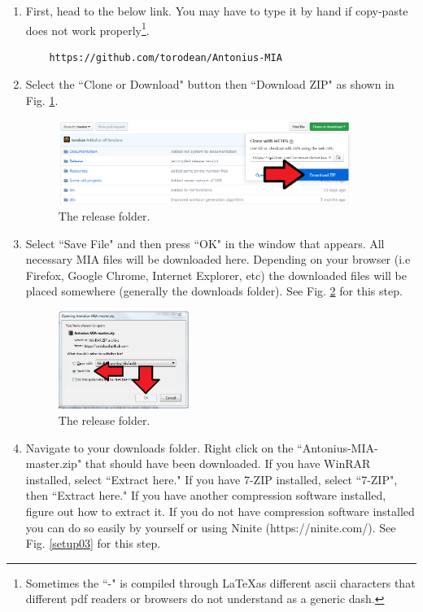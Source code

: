 \begin{enumerate}
	\item First, head to the below link. You may have to type it by hand if copy-paste does not work properly\footnote{Sometimes the ``-" is compiled through \LaTeX as different ascii characters that different pdf readers or browsers do not understand as a generic dash.}.

	\begin{lstlisting}
	https://github.com/torodean/Antonius-MIA
	\end{lstlisting}
	
	\item Select the ``Clone or Download" button then ``Download ZIP" as shown in Fig. \ref{setup01}.
	
	\begin{figure}[h]
		\centering
		\includegraphics[width=0.9\textwidth]{Images/setup01.png}
		\caption{The release folder.} \label{setup01}
	\end{figure}
	
	\item Select ``Save File" and then press ``OK" in the window that appears. All necessary MIA files will be downloaded here. Depending on your browser (i.e Firefox, Google Chrome, Internet Explorer, etc) the downloaded files will be placed somewhere (generally the downloads folder). See Fig. \ref{setup02} for this step.
	
	\begin{figure}[h]
		\centering
		\includegraphics[width=0.4\textwidth]{Images/setup02.png}
		\caption{The release folder.} \label{setup02}
	\end{figure}
	
	\item Navigate to your downloads folder. Right click on the ``Antonius-MIA-master.zip" that should have been downloaded. If you have WinRAR installed, select ``Extract here." If you have 7-ZIP installed, select ``7-ZIP", then ``Extract here." If you have another compression software installed, figure out how to extract it. If you do not have compression software installed you can do so easily by yourself or using Ninite (https://ninite.com/). See Fig. \ref{setup03} for this step.
	

\end{enumerate}

